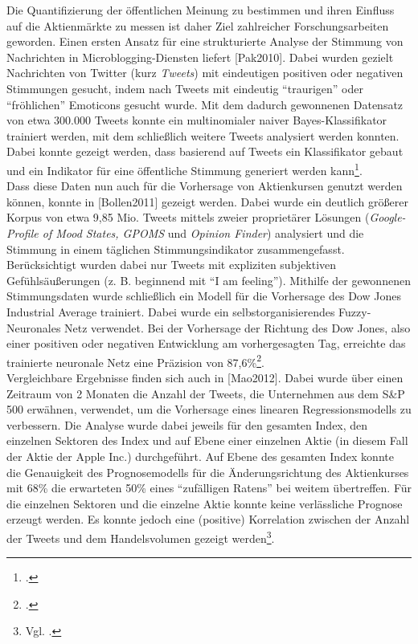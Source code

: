 \documentclass[
	a4paper,
	12pt,
	bibliography=totocnumbered,
	twoside,
]{scrreprt}
\begin{document}
Die Quantifizierung der öffentlichen Meinung zu bestimmen und ihren Einfluss auf die Aktienmärkte zu messen ist daher Ziel zahlreicher Forschungsarbeiten geworden. Einen ersten Ansatz für eine strukturierte Analyse der Stimmung von Nachrichten in Microblogging-Diensten liefert [Pak2010]. Dabei wurden gezielt Nachrichten von Twitter (kurz \textit{Tweets}) mit eindeutigen positiven oder negativen Stimmungen gesucht, indem nach Tweets mit eindeutig "`traurigen"' oder "`fröhlichen"' Emoticons gesucht wurde. Mit dem dadurch gewonnenen Datensatz von etwa 300.000 Tweets konnte ein multinomialer naiver Bayes-Klassifikator trainiert werden, mit dem schließlich weitere Tweets analysiert werden konnten. Dabei konnte gezeigt werden, dass basierend auf Tweets ein Klassifikator gebaut und ein Indikator für eine öffentliche Stimmung generiert werden kann\footnote{\citet{pak2010}.}.\\

Dass diese Daten nun auch für die Vorhersage von Aktienkursen genutzt werden können, konnte in [Bollen2011] gezeigt werden. Dabei wurde ein deutlich größerer Korpus von etwa 9,85 Mio. Tweets mittels zweier proprietärer Lösungen (\textit{Google-Profile of Mood States, GPOMS} und \textit{Opinion Finder}) analysiert und die Stimmung in einem täglichen Stimmungsindikator zusammengefasst. Berücksichtigt wurden dabei nur Tweets mit expliziten subjektiven Gefühlsäußerungen (z. B. beginnend mit "`I am feeling"'). Mithilfe der gewonnenen Stimmungsdaten wurde schließlich ein Modell für die Vorhersage des Dow Jones Industrial Average trainiert. Dabei wurde ein selbstorganisierendes Fuzzy-Neuronales Netz verwendet. Bei der Vorhersage der Richtung des Dow Jones, also einer positiven oder negativen Entwicklung am vorhergesagten Tag, erreichte das trainierte neuronale Netz eine Präzision von 87,6\%\footnote{\citet{bollen2011}.}.\\

Vergleichbare Ergebnisse finden sich auch in [Mao2012]. Dabei wurde über einen Zeitraum von 2 Monaten die Anzahl der Tweets, die Unternehmen aus dem S\&P 500 erwähnen, verwendet, um die Vorhersage eines linearen Regressionsmodells zu verbessern. Die Analyse wurde dabei jeweils für den gesamten Index, den einzelnen Sektoren des Index und auf Ebene einer einzelnen Aktie (in diesem Fall der Aktie der Apple Inc.) durchgeführt. Auf Ebene des gesamten Index konnte die Genauigkeit des Prognosemodells für die Änderungsrichtung des Aktienkurses mit 68\% die erwarteten 50\% eines "`zufälligen Ratens"' bei weitem übertreffen. Für die einzelnen Sektoren und die einzelne Aktie konnte keine verlässliche Prognose erzeugt werden. Es konnte jedoch eine (positive) Korrelation zwischen der Anzahl der Tweets und dem Handelsvolumen gezeigt werden\footnote{Vgl. \citet{mao2012}.}.\\
\end{document}
